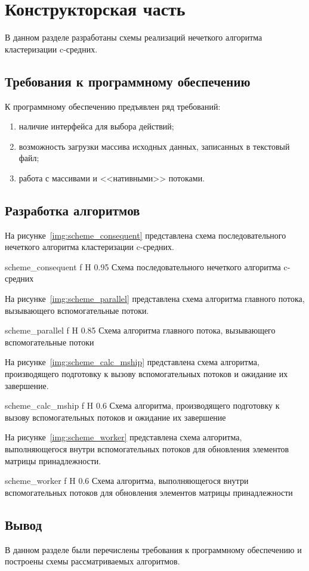 \chapter{Конструкторская часть}

В данном разделе разработаны схемы реализаций нечеткого алгоритма кластеризации c-средних.

\section{Требования к программному обеспечению}

К программному обеспечению предъявлен ряд требований:
\begin{enumerate}
	\item наличие интерфейса для выбора действий;
	\item возможность загрузки массива исходных данных, записанных в текстовый файл;
	\item работа с массивами и <<нативными>> потоками.
\end{enumerate}

\section{Разработка алгоритмов}

На рисунке~\ref{img:scheme_consequent} представлена схема последовательного нечеткого алгоритма кластеризации c-средних.

	{scheme_consequent}
	{f}
	{H}
	{0.95\textwidth}
	{Схема последовательного нечеткого алгоритма c-средних}

На рисунке~\ref{img:scheme_parallel} представлена схема алгоритма главного потока, вызывающего вспомогательные потоки.

	{scheme_parallel}
	{f}
	{H}
	{0.85\textwidth}
	{Схема алгоритма главного потока, вызывающего вспомогательные потоки}
	
На рисунке~\ref{img:scheme_calc_mship} представлена схема алгоритма, производящего подготовку к вызову вспомогательных потоков и ожидание их завершение.

	{scheme_calc_mship}
	{f}
	{H}
	{0.6\textwidth}
	{Схема алгоритма, производящего подготовку к вызову вспомогательных потоков и ожидание их завершение}

На рисунке~\ref{img:scheme_worker} представлена схема алгоритма, выполняющегося внутри вспомогательных потоков для обновления элементов матрицы принадлежности.

	{scheme_worker}
	{f}
	{H}
	{0.6\textwidth}
	{Схема алгоритма, выполняющегося внутри вспомогательных потоков для обновления элементов матрицы принадлежности}

\section*{Вывод}
В данном разделе были перечислены требования к программному обеспечению и построены схемы рассматриваемых алгоритмов.